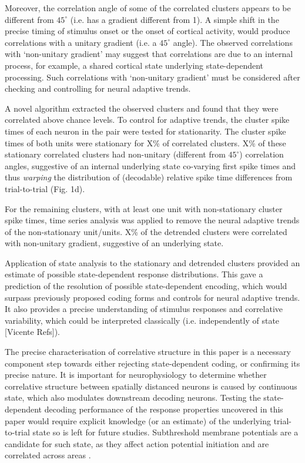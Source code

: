 \documentclass{article}
\begin{document}

Moreover, the correlation angle of some of the correlated clusters appears to be different from $45^{\circ}$ (i.e. has a gradient different from 1).
A simple shift in the precise timing of stimulus onset or the onset of cortical activity, would produce correlations with a unitary gradient (i.e. a $45^{\circ}$ angle). The observed correlations with `non-unitary gradient' may suggest that correlations are due to an internal process, for example, a shared cortical state underlying state-dependent processing. Such correlations with `non-unitary gradient' must be considered after checking and controlling for neural adaptive trends.

A novel algorithm extracted the observed clusters and found that they were correlated above chance levels. To control for adaptive trends, the cluster spike times of each neuron in the pair were tested for stationarity. The cluster spike times of both units were stationary for X\% of correlated clusters. X\% of these stationary correlated clusters had non-unitary (different from $45^{\circ}$) correlation angles, suggestive of an internal underlying state co-varying first spike times and thus \textit{warping} the distribution of (decodable) relative spike time differences from trial-to-trial (Fig. 1d).

For the remaining clusters, with at least one unit with non-stationary cluster spike times, time series analysis was applied to remove the neural adaptive trends of the non-stationary unit/units. X\% of the detrended clusters were correlated with non-unitary gradient, suggestive of an underlying state.

Application of state analysis to the stationary and detrended clusters provided an estimate of possible state-dependent response distributions. This gave a prediction of the resolution of possible state-dependent encoding, which would surpass previously proposed coding forms and controls for neural adaptive trends. It also provides a precise understanding of stimulus responses and correlative variability, which could be interpreted classically (i.e. independently of state [Vicente Refs]).

The precise characterisation of correlative structure in this paper is a necessary component step towards either rejecting state-dependent coding, or confirming its precise nature. It is important for neurophysiology to determine whether correlative structure between spatially distanced neurons is caused by continuous state, which also modulates downstream decoding neurons. Testing the state-dependent decoding performance of the response properties uncovered in this paper would require explicit knowledge (or an estimate) of the underlying trial-to-trial state so is left for future studies.
Subthreshold membrane potentials are a candidate for such state, as they affect action potential initiation \cite{petersen2003interaction} and are correlated across areas \cite{poulet2008internal}.
\end{document}
